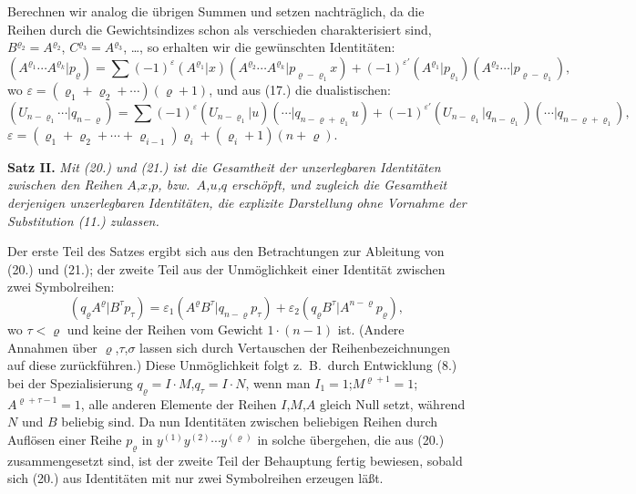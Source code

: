 \documentclass[12pt,a4paper]{article}
\begin{document}
Berechnen wir analog die übrigen Summen und setzen nachträglich, da die Reihen durch die Gewichtsindizes schon als verschieden charakterisiert sind, $B^{\varrho_{2}} = A^{\varrho_{2}}$, $C^{\varrho_{3}} = A^{\varrho_{3}}$, \ldots, so erhalten wir die gewünschten Identitäten:
\begin{equation}\tag{20}
(A^{\varrho_{1}} \cdots A^{\varrho_{k}} | p_{\varrho}) = \sum (-1)^{\varepsilon} (A^{\varrho_{1}} | x)(A^{\varrho_{2}} \cdots A^{\varrho_{k}} | p_{\varrho-\varrho_{1}} x) + (-1)^{\varepsilon'} (A^{\varrho_{1}} | p_{\varrho_{1}})(A^{\varrho_{2}} \cdots | p_{\varrho-\varrho_{1}}),
\end{equation}
wo $\varepsilon = (\varrho_{1} + \varrho_{2} + \cdots)(\varrho+1)$, und aus (17.) die dualistischen:
\begin{equation}\tag{21}
(U_{n-\varrho_{1}} \cdots | q_{n-\varrho}) = \sum (-1)^{\varepsilon} (U_{n-\varrho_{1}} | u)(\cdots | q_{n-\varrho+\varrho_{1}} u) + (-1)^{\varepsilon'} (U_{n-\varrho_{1}} | q_{n-\varrho_{1}})(\cdots | q_{n-\varrho+\varrho_{1}}),
\end{equation}
$\varepsilon = (\varrho_{1} + \varrho_{2} + \cdots + \varrho_{i-1}) \varrho_{i} + (\varrho_{i}+1)(n+\varrho)$.

\medskip
\textbf{Satz II.} \textit{Mit (20.) und (21.) ist die Gesamtheit der unzerlegbaren Identitäten zwischen den Reihen $A$,$x$,$p$, bzw.\ $A$,$u$,$q$ erschöpft, und zugleich die Gesamtheit derjenigen unzerlegbaren Identitäten, die explizite Darstellung ohne Vornahme der Substitution (11.) zulassen.}
\medskip

Der erste Teil des Satzes ergibt sich aus den Betrachtungen zur Ableitung von (20.) und (21.); der zweite Teil aus der Unmöglichkeit einer Identität zwischen zwei Symbolreihen:
\begin{equation*}
(q_{\varrho} A^{\varrho} | B^{\tau} p_{\tau}) = \varepsilon_{1} (A^{\varrho} B^{\tau} | q_{n-\varrho} p_{\tau}) + \varepsilon_{2} (q_{\varrho} B^{\tau} | A^{n-\varrho} p_{\varrho}),
\end{equation*}
wo $\tau < \varrho$ und keine der Reihen vom Gewicht $1 \cdot (n-1)$ ist. (Andere Annahmen über $\varrho$,$\tau$,$\sigma$ lassen sich durch Vertauschen der Reihenbezeichnungen auf diese zurückführen.) Diese Unmöglichkeit folgt z.\ B.\ durch Entwicklung (8.) bei der Spezialisierung $q_{\varrho} = I \cdot M$,$q_{\tau} = I \cdot N$, wenn man $I_{1} = 1$;$M^{\varrho+1} = 1$;$A^{\varrho+\tau-1} = 1$, alle anderen Elemente der Reihen $I$,$M$,$A$ gleich Null setzt, während $N$ und $B$ beliebig sind. Da nun Identitäten zwischen beliebigen Reihen durch Auflösen einer Reihe $p_{\varrho}$ in $y^{(1)} y^{(2)} \cdots y^{(\varrho)}$ in solche übergehen, die aus (20.) zusammengesetzt sind, ist der zweite Teil der Behauptung fertig bewiesen, sobald sich (20.) aus Identitäten mit nur zwei Symbolreihen erzeugen läßt.
\end{document}
